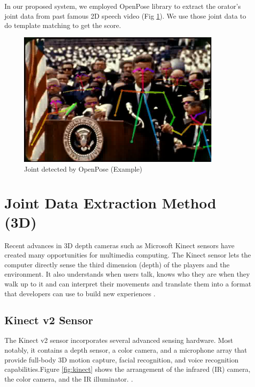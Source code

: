 \par In our proposed system, we employed OpenPose library to extract the orator's joint data from past famous 2D speech video (Fig \ref{fig:jfk}). We use those joint data to do template matching to get the score.
\begin{figure}[htbp]
  \centering\includegraphics[width=0.9\textwidth]{./img/jfk.png}
  \caption{Joint detected by OpenPose (Example)}\label{fig:jfk}
\end{figure}



\section{Joint Data Extraction Method (3D)}
\par Recent advances in 3D depth cameras such as Microsoft Kinect sensors have created many opportunities for multimedia computing. The Kinect sensor lets the computer directly sense the third dimension (depth) of the players and the environment. It also understands when users talk, knows who they are when they walk up to it and can interpret their movements and translate them into a format that developers can use to build new experiences \cite{Zhang2012}.
\subsection*{Kinect v2 Sensor}
\par The Kinect v2 sensor incorporates several advanced sensing hardware. Most notably, it contains a depth sensor, a color camera, and a microphone array that provide full-body 3D motion capture, facial recognition, and voice recognition capabilities.Figure \ref{fig:kinect} shows the arrangement of the infrared (IR) camera, the color camera, and the IR illuminator. . 

